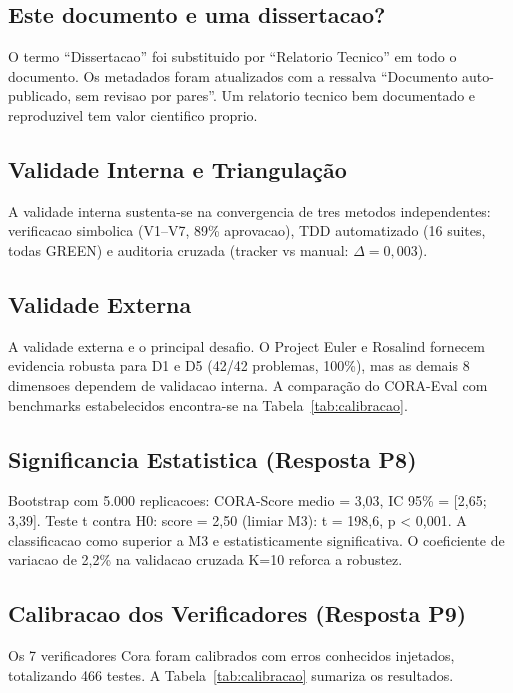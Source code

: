 \documentclass[12pt,a4paper,oneside]{article}
\begin{document}
\subsection{Este documento e uma dissertacao?}

O termo ``Dissertacao'' foi substituido por ``Relatorio Tecnico'' em todo o
documento. Os metadados foram atualizados com a ressalva ``Documento
auto-publicado, sem revisao por pares''. Um relatorio tecnico bem documentado
e reproduzivel tem valor cientifico proprio.

\subsection{Validade Interna e Triangulação}

A validade interna sustenta-se na convergencia de tres metodos independentes:
verificacao simbolica (V1--V7, 89\% aprovacao), TDD automatizado (16 suites,
todas GREEN) e auditoria cruzada (tracker vs manual: $\Delta = 0,003$).

\subsection{Validade Externa}

A validade externa e o principal desafio. O Project Euler e Rosalind fornecem
evidencia robusta para D1 e D5 (42/42 problemas, 100\%), mas as demais 8
dimensoes dependem de validacao interna. A comparação do
CORA-Eval com benchmarks estabelecidos encontra-se na Tabela~\ref{tab:calibracao}.

\subsection{Significancia Estatistica (Resposta P8)}

Bootstrap com 5.000 replicacoes: CORA-Score medio = 3,03, IC 95\% = [2,65; 3,39].
Teste t contra H0: score = 2,50 (limiar M3): t = 198,6, p < 0,001. A
classificacao como superior a M3 e estatisticamente significativa. O coeficiente
de variacao de 2,2\% na validacao cruzada K=10 reforca a robustez.

\subsection{Calibracao dos Verificadores (Resposta P9)}

Os 7 verificadores Cora foram calibrados com erros conhecidos injetados,
totalizando 466 testes. A Tabela~\ref{tab:calibracao} sumariza os resultados.
\end{document}
